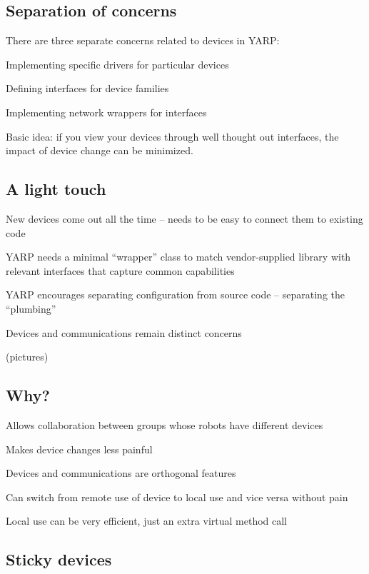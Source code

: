 \subsection{Separation of concerns}

There are three separate concerns related to devices in YARP:

Implementing specific drivers for particular devices 

Defining interfaces for device families 

Implementing network wrappers for interfaces

Basic idea: if you view your devices through well thought out
interfaces, the impact of device change can be minimized.


\subsection{A light touch}

New devices come out all the time -- needs to be easy to connect them
to existing code

YARP needs a minimal ``wrapper'' class to match vendor-supplied
library with relevant interfaces that capture common capabilities

YARP encourages separating configuration from source code -- separating
the ``plumbing''

Devices and communications remain distinct concerns

(pictures)


\subsection*{Why?}

Allows collaboration between groups whose robots have different devices

Makes device changes less painful

Devices and communications are orthogonal features

Can switch from remote use of device to local use and vice versa without pain

Local use can be very efficient, just an extra virtual method call





\subsection{Sticky devices}

